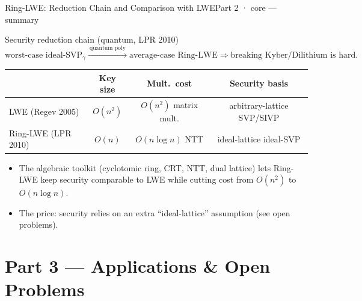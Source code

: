 \documentclass[aspectratio=169, 11pt]{beamer}
\begin{document}
\begin{frame}{Ring-LWE: Reduction Chain and Comparison with LWE}{Part 2 · core --- summary}
  \begin{block}{Security reduction chain (quantum, LPR 2010)}
    \[
      \text{worst-case ideal-SVP}_\gamma
      \xrightarrow{\ \text{quantum poly}\ }
      \text{average-case Ring-LWE}
      \Longrightarrow
      \text{breaking Kyber/Dilithium is hard}.
    \]
  \end{block}
  \begin{center}\small
  \begin{tabular}{l c c c}
    \hline
    & Key size & Mult.\ cost & Security basis \\
    \hline
    LWE (Regev 2005) & $O(n^2)$ & $O(n^2)$ matrix mult. & arbitrary-lattice SVP/SIVP \\
    Ring-LWE (LPR 2010) & $O(n)$ & $O(n\log n)$ NTT & ideal-lattice ideal-SVP \\
    \hline
  \end{tabular}
  \end{center}
  \vspace{2pt}
  \begin{itemize}\small
    \item The algebraic toolkit (cyclotomic ring, CRT, NTT, dual lattice) lets Ring-LWE
      \alert{keep security comparable to LWE while cutting cost from $O(n^2)$ to $O(n\log n)$}.
    \item The price: security relies on an extra ``ideal-lattice'' assumption (see open problems).
  \end{itemize}
\end{frame}

\section{Part 3 --- Applications \& Open Problems}
\end{document}

